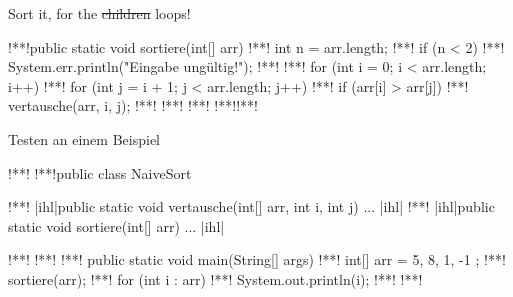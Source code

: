 {\iffull
{
    \AddonFrame
    \begin{frame}[fragile,c]{Sort it, for the \sout{children} loops!}
\begin{plainjava}
!**!public static void sortiere(int[] arr) {
!**!    int n = arr.length;
!**!    if (n < 2) {
!**!        System.err.println("Eingabe ungültig!");
!**!    }
!**!    for (int i = 0; i < arr.length; i++) {
!**!        for (int j = i + 1; j < arr.length; j++) {
!**!            if (arr[i] > arr[j]) {
!**!                vertausche(arr, i, j);
!**!            }
!**!        }
!**!    }
!**!}!**!
\end{plainjava}
    \end{frame}
}
\fi

\begin{frame}[fragile,c]{Testen an einem Beispiel}
\SetupLstHl
\begin{plainjava}
!**!
!**!public class NaiveSort {
!**!   |ihl|public static void vertausche(int[] arr, int i, int j) { ... }|ihl|
!**!   |ihl|public static void sortiere(int[] arr) { ... }|ihl|

!**!   !**!
!**!   public static void main(String[] args) {
!**!      int[] arr = { 5, 8, 1, -1 };
!**!      sortiere(arr);
!**!      for (int i : arr)
!**!        System.out.println(i);
!**!   }
!**!}
\end{plainjava}
%
\end{frame}

}
